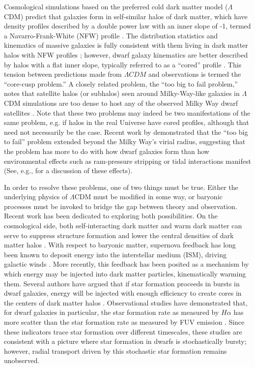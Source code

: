 \documentclass[iop]{emulateapj}
\begin{document}
Cosmological simulations based on the preferred cold dark matter model ($\Lambda$CDM) predict that galaxies form in self-similar halos of dark matter, which have density profiles described by a double power law with an inner slope of -1, termed a Navarro-Frank-White (NFW) profile \citep{NFW}. The distribution statistics and kinematics of massive galaxies is fully consistent with them living in dark matter halos with NFW profiles \citep{Wambsganss04,Springel05,BK09,Klypin11}; however, dwarf galaxy kinematics are better described by halos with a flat inner slope, typically referred to as a ``cored'' profile \citep{Moore94,McGaugh01,Marchesini02,Simon05,deblok08}. This tension between predictions made from $\Lambda CDM$ and observations is termed the ``core-cusp problem.'' A closely related problem, the ``too big to fail problem,''  notes that satellite halos (or subhalos) seen around Milky-Way-like galaxies in $\Lambda$CDM simulations are too dense to host any of the observed Milky Way dwarf satellites \citep{BK11,BK12}. Note that these two problems may indeed be two manifestations of the same problem, e.g. if halos in the real Universe have cored profiles, although that need not necessarily be the case. Recent work by \cite{GK14} demonstrated that the ``too big to fail'' problem extended beyond the Milky Way's virial radius, suggesting that the problem has more to do with how dwarf galaxies form than how environmental effects such as ram-pressure stripping or tidal interactions manifest (See, e.g., \citet{Gunn72,Larson80,Farouki81,Moore96,Balogh2000} for a discussion of these effects).

In order to resolve these problems, one of two things must be true. Either the underlying physics of $\Lambda$CDM must be modified in some way, or baryonic processes must be invoked to bridge the gap between theory and observation. Recent work has been dedicated to exploring both possibilities. On the cosmological side, both self-interacting dark matter and warm dark matter can serve to suppress structure formation and lower the central densities of dark matter halos \citep{Lovell14,Elbert14}. With respect to baryonic matter, supernova feedback has long been known to deposit energy into the interstellar medium (ISM), driving galactic winds \citep{Larson74,Dekel86}. More recently, this feedback has been posited as a mechanism by which energy may be injected into dark matter particles, kinematically warming them. Several authors have argued that if star formation proceeds in bursts in dwarf galaxies, energy will be injected with enough efficiency to create cores in the centers of dark matter halos \citep{Governato10,Governato12,PG12}. Observational studies have demonstrated that, for dwarf galaxies in particular, the star formation rate as measured by $H\alpha$ has more scatter than the star formation rate as measured by FUV emission \citep{Sullivan00,Boselli09,Shivaei15,Guo16,Sparre17}. Since these indicators trace star formation over different timescales, these studies are consistent with a picture where star formation in dwarfs is stochastically bursty; however, radial transport driven by this stochastic star formation remains unobserved.
\end{document}
